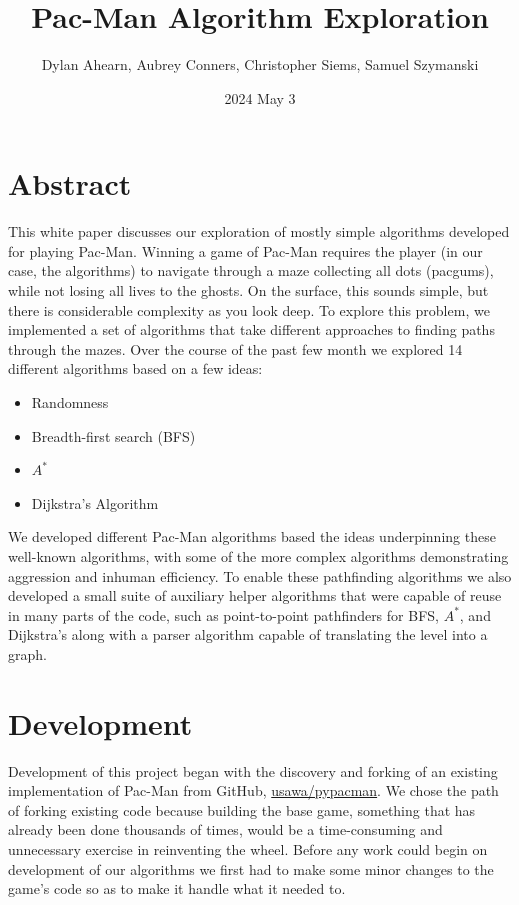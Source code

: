 \documentclass[12pt]{article}
\title{Pac-Man Algorithm Exploration}
\author{Dylan Ahearn, Aubrey Conners, Christopher Siems, Samuel Szymanski}
\date{2024 May 3}
\begin{document}
  \maketitle
  \section*{Abstract}
    This white paper discusses our exploration of mostly simple algorithms developed for playing Pac-Man. Winning a game of Pac-Man requires the player (in our case, the algorithms) to navigate through a maze collecting all dots (pacgums), while not losing all lives to the ghosts. On the surface, this sounds simple, but there is considerable complexity as you look deep. To explore this problem, we implemented a set of algorithms that take different approaches to finding paths through the mazes. Over the course of the past few month we explored 14 different algorithms based on a few ideas:
    \begin{multicols}{2}
      \begin{itemize}
        \itemsep0pt
        \item Randomness
        \item Breadth-first search (BFS)
        \item $A^*$
        \item Dijkstra's Algorithm
      \end{itemize}
    \end{multicols}
    We developed different Pac-Man algorithms based the ideas underpinning these well-known algorithms, with some of the more complex algorithms demonstrating aggression and inhuman efficiency. To enable these pathfinding algorithms we also developed a small suite of auxiliary helper algorithms that were capable of reuse in many parts of the code, such as point-to-point pathfinders for BFS, $A^*$, and Dijkstra's along with a parser algorithm capable of translating the level into a graph.
  \section*{Development}
    Development of this project began with the discovery and forking of an existing implementation of Pac-Man from GitHub, \href{https://github.com/usawa/pypacman}{usawa/pypacman}. We chose the path of forking existing code because building the base game, something that has already been done thousands of times, would be a time-consuming and unnecessary exercise in reinventing the wheel. Before any work could begin on development of our algorithms we first had to make some minor changes to the game's code so as to make it handle what it needed to.
\end{document}
